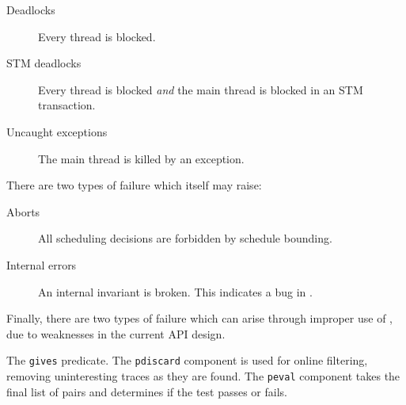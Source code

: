 \begin{description}
\item[Deadlocks] Every thread is blocked.
\item[STM deadlocks] Every thread is blocked \emph{and} the main
  thread is blocked in an STM transaction.
\item[Uncaught exceptions] The main thread is killed by an exception.
\end{description}

There are two types of failure which \dejafu{} itself may raise:

\begin{description}
\item[Aborts] All scheduling decisions are forbidden by schedule
  bounding.
\item[Internal errors] An internal invariant is broken.  This
  indicates a bug in \dejafu{}.
\end{description}

Finally, there are two types of failure which can arise through
improper use of \dejafu{}, due to weaknesses in the current API
design.

\begin{listing}
\centering
{}
\caption[The \texttt{gives} predicate.]{The \texttt{gives} predicate.  The \texttt{pdiscard} component is used for online filtering, removing uninteresting traces as they are found.  The \texttt{peval} component takes the final list of pairs and determines if the test passes or fails.}\label{lst:gives}
\end{listing}

